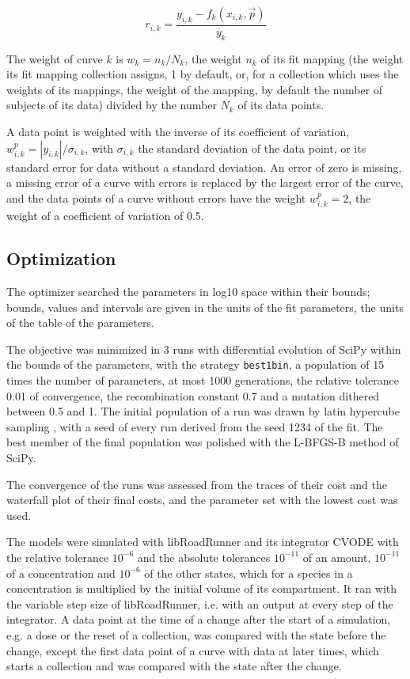 \documentclass{article}
\begin{document}
\begin{equation}
r_{i,k} = \frac{y_{i,k} - f_k(x_{i,k}, \vec{p})}{\overline{y}_k}
\end{equation}

The weight of curve $k$ is $w_k = n_k / N_k$, the weight $n_k$ of its fit mapping (the weight its fit mapping collection assigns, 1 by default, or, for a collection which uses the weights of its mappings, the weight of the mapping, by default the number of subjects of its data) divided by the number $N_k$ of its data points.

A data point is weighted with the inverse of its coefficient of variation, $w^{p}_{i,k} = |y_{i,k}| / \sigma_{i,k}$, with $\sigma_{i,k}$ the standard deviation of the data point, or its standard error for data without a standard deviation. An error of zero is missing, a missing error of a curve with errors is replaced by the largest error of the curve, and the data points of a curve without errors have the weight $w^{p}_{i,k} = 2$, the weight of a coefficient of variation of 0.5.

\subsection{Optimization}

The optimizer searched the parameters in log10 space within their bounds; bounds, values and intervals are given in the units of the fit parameters, the units of the table of the parameters.

The objective was minimized in 3 runs with differential evolution \cite{Storn1997} of SciPy \cite{Virtanen2020} within the bounds of the parameters, with the strategy \texttt{best1bin}, a population of 15 times the number of parameters, at most 1000 generations, the relative tolerance 0.01 of convergence, the recombination constant 0.7 and a mutation dithered between 0.5 and 1. The initial population of a run was drawn by latin hypercube sampling \cite{McKay1979}, with a seed of every run derived from the seed 1234 of the fit. The best member of the final population was polished with the L-BFGS-B method of SciPy.

The convergence of the runs was assessed from the traces of their cost and the waterfall plot of their final costs, and the parameter set with the lowest cost was used.

The models were simulated with libRoadRunner \cite{Welsh2023} and its integrator CVODE \cite{Hindmarsh2005} with the relative tolerance $10^{-6}$ and the absolute tolerances $10^{-11}$ of an amount, $10^{-11}$ of a concentration and $10^{-6}$ of the other states, which for a species in a concentration is multiplied by the initial volume of its compartment. It ran with the variable step size of libRoadRunner, i.e. with an output at every step of the integrator. A data point at the time of a change after the start of a simulation, e.g. a dose or the reset of a collection, was compared with the state before the change, except the first data point of a curve with data at later times, which starts a collection and was compared with the state after the change.
\end{document}
